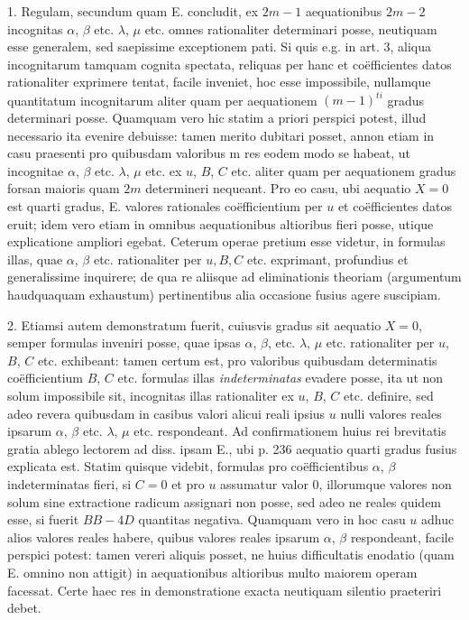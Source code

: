 \documentclass[14pt]{memoir}
\theoremstyle{plain}
\theoremstyle{remark}
\begin{document}
1.  Regulam, secundum quam \textsc{E.} concludit, ex \(2m-1\) aequationibus \(2m-2\) incognitas \(\alpha\), \(\beta\) etc. \(\lambda\), \(\mu\) etc. omnes rationaliter determinari posse, neutiquam esse generalem, sed saepissime exceptionem pati. Si quis e.g. in art. 3, aliqua incognitarum tamquam cognita spectata, reliquas per hanc et co\"efficientes datos rationaliter exprimere tentat, facile inveniet, hoc esse impossibile, nullamque quantitatum incognitarum aliter quam per aequationem \((m-1)^{ti}\) gradus determinari posse. Quamquam vero hic statim a priori perspici potest, illud necessario ita evenire debuisse: tamen merito dubitari posset, annon etiam in casu praesenti pro quibusdam valoribus m res eodem modo se habeat, ut incognitae \(\alpha\), \(\beta\) etc. \(\lambda\), \(\mu\) etc. ex \(u\), \(B\), \(C\) etc. aliter quam per aequationem gradus forsan maioris quam \(2m\) determineri nequeant. Pro eo casu, ubi aequatio \(X = 0\) est quarti gradus, \textsc{E.} valores rationales co\"efficientium per \(u\) et co\"efficientes datos eruit; idem vero etiam in omnibus aequationibus altioribus fieri posse, utique explicatione ampliori egebat.   Ceterum operae pretium esse videtur, in formulas illas, quae \(\alpha\), \(\beta\) etc. rationaliter per \(u, B, C\) etc. exprimant, profundius et generalissime inquirere; de qua re aliisque ad eliminationis theoriam (argumentum haudquaquam exhaustum) pertinentibus alia occasione fusius agere suscipiam.

2.  Etiamsi autem demonstratum fuerit, cuiusvis gradus sit aequatio \(X = 0\), semper formulas inveniri posse, quae ipsas \(\alpha\), \(\beta\),  etc. \(\lambda\), \(\mu\) etc. rationaliter per \(u\), \(B\), \(C\) etc. exhibeant: tamen certum est, pro valoribus quibusdam determinatis co\"efficientium \(B\), \(C\) etc. formulas illas \textit{indeterminatas} evadere posse, ita ut non solum impossibile sit, incognitas illas rationaliter ex \(u\), \(B\), \(C\) etc. definire, sed adeo revera quibusdam in casibus valori alicui reali ipsius \(u\) nulli valores reales ipsarum \(\alpha\), \(\beta\) etc. \(\lambda\), \(\mu\) etc. respondeant.  Ad confirmationem huius rei brevitatis gratia ablego lectorem ad diss. ipsam \textsc{E.}, ubi p. 236 aequatio quarti gradus fusius explicata est.   Statim quisque videbit, formulas pro co\"efficientibus \(\alpha\), \(\beta\) indeterminatas fieri, si \(C = 0\) et pro \(u\) assumatur valor \(0\), illorumque valores non solum sine extractione radicum assignari non posse, sed adeo ne reales quidem esse, si fuerit \(BB-4D\) quantitas negativa. Quamquam vero in hoc casu \(u\) adhuc alios valores reales habere, quibus valores reales ipsarum \(\alpha\), \(\beta\) respondeant, facile perspici potest: tamen vereri aliquis posset, ne huius difficultatis enodatio (quam \textsc{E.} omnino non attigit) in aequationibus altioribus multo maiorem operam facessat. Certe haec res in demonstratione exacta neutiquam silentio praeteriri debet.
\end{document}

